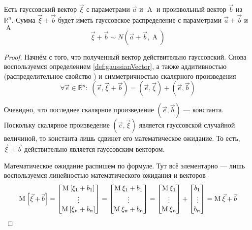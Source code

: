 \begin{lemma}\label{lemma:gaussMoved}
  Есть гауссовский вектор $\vec{\xi}$ с параметрами $\vec{a}$ и $\operatorname{A}$
  и произвольный вектор $\vec{b}$ из $\mathbb{R}^n$.
  Сумма $\vec{\xi} + \vec{b}$ будет иметь гауссовское распределение с
  параметрами $\vec{a} + \vec{b}$ и $\operatorname{A}$
  $$\vec{\xi} + \vec{b} \sim N\left( \vec{a} + \vec{b}, \operatorname{A} \right)$$
\end{lemma}
\begin{proof}
  Начнём с того, что полученный вектор действительно гауссовский.
  Снова воспользуемся определением \ref{def:gaussianVector}, а также
  аддитивностью (распределительное свойство \cite[с.~82]{VoevodinLA})
  и симметричностью скалярного произведения
  $$\forall \vec{e} \in \mathbb{R}^n:\;
      \left( \vec{e}, \vec{\xi} + \vec{b} \right)
      = \left( \vec{e}, \vec{\xi} \right)
          + \left( \vec{e}, \vec{b} \right)$$

  Очевидно, что последнее скалярное произведение
  $\left( \vec{e}, \vec{b} \right)$ --- константа. Поскольку скалярное
  произведение $\left( \vec{e}, \vec{\xi} \right)$ является гауссовской
  случайной величиной, то константа лишь сдвинет его математическое
  ожидание. То есть, $\vec{\xi} + \vec{b}$ действительно является
  гауссовским вектором.

  Математическое ожидание распишем по формуле. Тут всё элементарно --- лишь
  воспользуемся линейностью математического ожидания и векторов
  $$\operatorname{M}_{} \left[ \vec{\xi} + \vec{b} \right]
      =   \begin{bmatrix}
          \operatorname{M}_{} \left[ \xi_1 + b_1 \right] \\\vdots \\\operatorname{M}_{} \left[ \xi_n + b_n \right]
      \end{bmatrix}
      =   \begin{bmatrix}
          \operatorname{M}_{} \xi_1 + b_1 \\\vdots \\\operatorname{M}_{} \xi_n + b_n
      \end{bmatrix}
      =   \begin{bmatrix}
          \operatorname{M}_{} \xi_1 \\\vdots \\\operatorname{M}_{} \xi_n
      \end{bmatrix}
      +
      \begin{bmatrix}
          b_1 \\\vdots \\ b_n
      \end{bmatrix}
      = \operatorname{M}_{} \vec{\xi} + \vec{b}$$


\end{proof}
